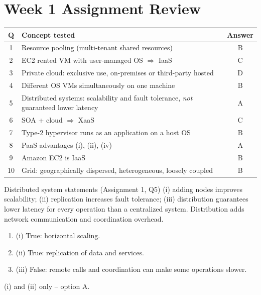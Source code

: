 \section{Week 1 Assignment Review}
\begin{center}
\begin{tabularx}{\textwidth}{cXc}
\toprule
Q & Concept tested & Answer\\
\midrule
1 & Resource pooling (multi-tenant shared resources) & B\\
2 & EC2 rented VM with user-managed OS $\Rightarrow$ IaaS & C\\
3 & Private cloud: exclusive use, on-premises or third-party hosted & D\\
4 & Different OS VMs simultaneously on one machine & B\\
5 & Distributed systems: scalability and fault tolerance, \emph{not} guaranteed lower latency & A\\
6 & SOA + cloud $\Rightarrow$ XaaS & C\\
7 & Type-2 hypervisor runs as an application on a host OS & B\\
8 & PaaS advantages (i), (ii), (iv) & A\\
9 & Amazon EC2 is IaaS & B\\
10 & Grid: geographically dispersed, heterogeneous, loosely coupled & B\\
\bottomrule
\end{tabularx}
\end{center}

\begin{solved}{Distributed system statements (Assignment 1, Q5)}
\Given (i) adding nodes improves scalability; (ii) replication increases fault tolerance;
(iii) distribution guarantees lower latency for every operation than a centralized system.
\Formula Distribution adds network communication and coordination overhead.
\Steps
\begin{enumerate}[leftmargin=*]
  \item (i) True: horizontal scaling.
  \item (ii) True: replication of data and services.
  \item (iii) False: remote calls and coordination can make some operations slower.
\end{enumerate}
\Answer (i) and (ii) only -- option A.
\end{solved}
